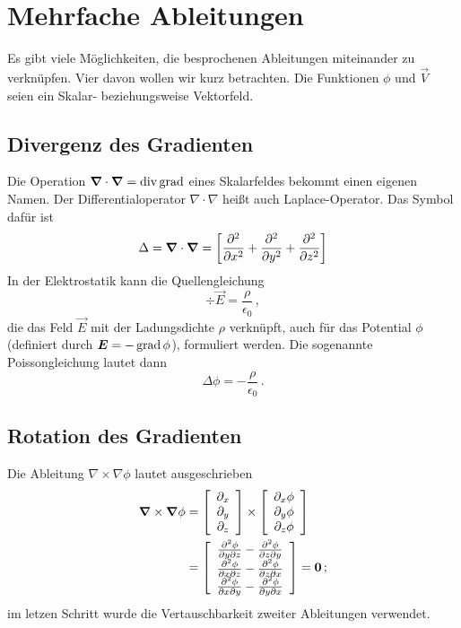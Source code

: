 \documentclass[paper=a4, fontsize=11.0pt, abstractoff, DIV12]{scrartcl}
\begin{document}



\section{Mehrfache Ableitungen}

Es gibt viele Möglichkeiten, die besprochenen Ableitungen miteinander zu verknüpfen. Vier davon wollen wir kurz betrachten. Die Funktionen $\phi$ und
$\vec V$ seien ein Skalar- beziehungsweise Vektorfeld.

\subsection{Divergenz des Gradienten}

Die Operation $\nabla\cdot\nabla=\div\grad$ eines Skalarfeldes bekommt einen eigenen Namen.
Der Differentialoperator $\nabla\cdot\nabla$ heißt auch \glqq Laplace-Operator\grqq. Das Symbol dafür ist
\begin{equation}
\Delta = \nabla\cdot\nabla = \left[\secondpderiv{}{x} + \secondpderiv{}{y} + \secondpderiv{}{z}\right]
\end{equation}
In der Elektrostatik kann die Quellengleichung
\begin{equation}
\div \vec E = \frac{\rho}{\epsilon_0}\, ,
\end{equation}
die das Feld $\vec E$ mit der Ladungsdichte $\rho$ verknüpft, auch für das
Potential $\phi$ (definiert durch ${\boldsymbol{E}} = -\operatorname{grad} \phi$), formuliert
werden. Die sogenannte Poissongleichung lautet dann
\begin{equation}
\Delta \phi = - \frac{\rho}{\epsilon_0}\,.
\end{equation}

\subsection{Rotation des Gradienten}

Die Ableitung $\nabla\times\nabla\phi$ lautet ausgeschrieben
\begin{align}
\nabla\times\nabla\phi &= \DreierVec{\partial_x}{\partial_y}{\partial_z}\times
\DreierVec{\partial_x\phi}{\partial_y\phi}{\partial_z\phi}\nonumber\\
&= \DreierVec{\secondmpderiv{\phi}{y}{z} - \secondmpderiv{\phi}{z}{y}}{\secondmpderiv{\phi}{x}{z} - \secondmpderiv{\phi}{z}{x}}{\secondmpderiv{\phi}{x}{y} - \secondmpderiv{\phi}{y}{x}} = \vec 0\,;
\end{align}
im letzen Schritt wurde die Vertauschbarkeit zweiter Ableitungen verwendet.
\end{document}
